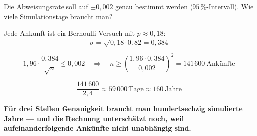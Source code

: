 \begin{aufgabe}
Die Abweisungsrate soll auf $\pm 0{,}002$ genau bestimmt werden ($95\,\%$-Intervall). Wie viele Simulationstage braucht man?

\loesung
{}
Jede Ankunft ist ein Bernoulli-Versuch mit $p \approx 0{,}18$:
\[ \sigma = \sqrt{0{,}18\cdot0{,}82} = 0{,}384 \]

\[ 1{,}96\cdot\frac{0{,}384}{\sqrt n} \le 0{,}002 \quad\Longrightarrow\quad n \ge \left(\frac{1{,}96\cdot0{,}384}{0{,}002}\right)^{2} = 141\,600 \ \text{Ankünfte} \]

\[ \frac{141\,600}{2{,}4} \approx 59\,000 \ \text{Tage} \approx 160 \ \text{Jahre} \]

\begin{center}
\begin{minipage}{0.9\textwidth}
\textbf{Für drei Stellen Genauigkeit braucht man hundertsechzig simulierte Jahre --- und die Rechnung unterschätzt noch, weil aufeinanderfolgende Ankünfte nicht unabhängig sind.}
\end{minipage}
\end{center}

\begin{center}
\begin{minipage}{0.88\textwidth}
\end{minipage}
\end{center}
\end{aufgabe}

